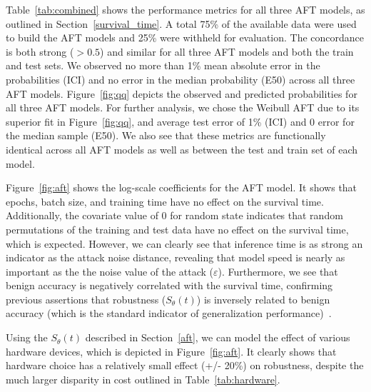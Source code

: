\documentclass[conference]{IEEEtran}
\begin{document}
{Table~\ref{tab:combined} shows the performance metrics for all three AFT models, as outlined in Section~\ref{survival_time}. A total 75\% of the available data were used to build the AFT models and 25\% were withheld for evaluation. The concordance is both strong ($>0.5$) and similar for all three AFT models and both the train and test sets. We observed no more than 1\% mean absolute error in the probabilities (ICI) and no error in the median probability (E50) across all three AFT models. Figure~\ref{fig:qq} depicts the observed and predicted probabilities for all three AFT models. For further analysis, we chose the Weibull AFT due to its superior fit in Figure~\ref{fig:qq}, and average test error of 1\% (ICI) and 0 error for the median sample (E50). We also see that these metrics are  functionally identical across all AFT models as well as between the test and train set of each model. 


Figure~\ref{fig:aft} shows the log-scale coefficients for the AFT model. It shows that epochs, batch size, and training time have no effect on the survival time. Additionally, the covariate value of 0 for random state indicates that random permutations of the training and test data have no effect on the survival time, which is expected. However, we can clearly see that inference time  is as strong an indicator as the attack noise distance, revealing that model speed is nearly as important as the the noise value of the attack ($\varepsilon$). Furthermore, we see that benign accuracy is negatively correlated with the survival time, confirming previous assertions that robustness ($S_{\theta}(t)$) is inversely related to benign accuracy (which is the standard indicator of generalization performance)~\cite{carlini_towards_2017}.

Using the $S_{\theta}(t)$ described in Section~\ref{aft}, we can model the effect of various hardware devices, which is depicted in Figure~\ref{fig:aft}. It clearly shows that hardware choice has a relatively small effect (+/- 20\%) on robustness, despite the much larger disparity in cost outlined in Table~\ref{tab:hardware}.

}
\end{document}
